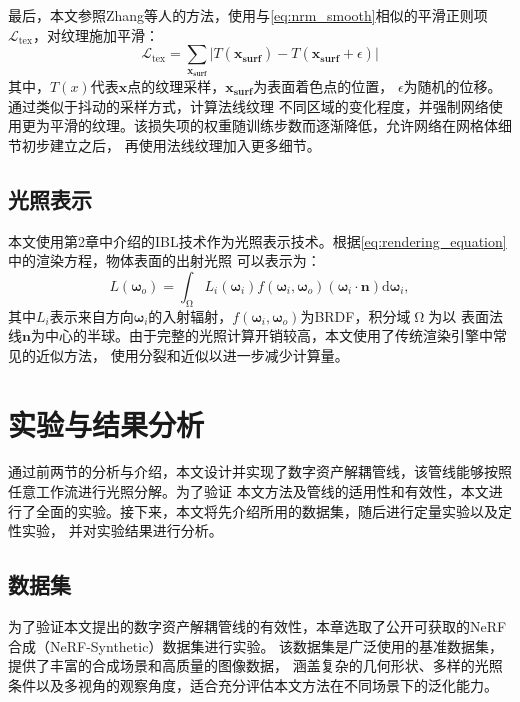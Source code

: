 最后，本文参照Zhang等人\cite{zhang2021nerfactor}的方法，使用与\ref{eq:nrm_smooth}相似的平滑正则项$\mathcal{L}_\text{tex}$，对纹理施加平滑：
\begin{equation}
  \label{eq:tex_smooth}
  \mathcal{L}_{\text{tex}} = \sum_{\boldsymbol{x_\text{surf}}} {\lvert {T({\boldsymbol{x_\text{surf}}})} - {T({\boldsymbol{x_\text{surf}}}+\epsilon)}\rvert}
\end{equation}
其中，$T(x)$代表$\boldsymbol{x}$点的纹理采样，$\boldsymbol{x_\text{surf}}$为表面着色点的位置，
$\epsilon$为随机的位移。通过类似于抖动的采样方式，计算法线纹理
不同区域的变化程度，并强制网络使用更为平滑的纹理。该损失项的权重随训练步数而逐渐降低，允许网络在网格体细节初步建立之后，
再使用法线纹理加入更多细节。


\subsection{光照表示}
本文使用第2章中介绍的IBL技术作为光照表示技术。根据\eqref{eq:rendering_equation}中的渲染方程，物体表面的出射光照
可以表示为：
\begin{equation}
  \label{eq:radiance}
  L\left({\boldsymbol{\omega}}_o\right)=\int_{\upOmega} L_i\left({\boldsymbol{\omega}}_i\right)f\left({\boldsymbol{\omega}}_i,{\boldsymbol{\omega}}_o\right)\left({\boldsymbol{\omega}}_i\cdot\boldsymbol{n}\right)\mathrm{d}{\boldsymbol{\omega}}_i,
\end{equation}
其中$L_i$表示来自方向${\boldsymbol{\omega}}_i$的入射辐射，$f\left({\boldsymbol{\omega}}_i,{\boldsymbol{\omega}}_o\right)$为BRDF，积分域$\upOmega$为以
表面法线$\boldsymbol{n}$为中心的半球。由于完整的光照计算开销较高，本文使用了传统渲染引擎中常见的近似方法\cite{Hill_2014}，
使用分裂和近似以进一步减少计算量。

\section{实验与结果分析}
通过前两节的分析与介绍，本文设计并实现了数字资产解耦管线，该管线能够按照任意工作流进行光照分解。为了验证
本文方法及管线的适用性和有效性，本文进行了全面的实验。接下来，本文将先介绍所用的数据集，随后进行定量实验以及定性实验，
并对实验结果进行分析。
\subsection{数据集}

为了验证本文提出的数字资产解耦管线的有效性，本章选取了公开可获取的NeRF合成（NeRF-Synthetic）数据集进行实验。
该数据集是广泛使用的基准数据集，提供了丰富的合成场景和高质量的图像数据，
涵盖复杂的几何形状、多样的光照条件以及多视角的观察角度，适合充分评估本文方法在不同场景下的泛化能力。

